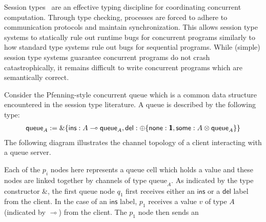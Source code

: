 Session types~\cite{honda93} are an effective typing discipline for coordinating
concurrent computation. Through type checking, processes are forced to adhere to
communication protocols and maintain synchronization. This allows session type
systems to statically rule out runtime bugs for concurrent programs similarly to
how standard type systems rule out bugs for sequential programs. While (simple)
session type systems guarantee concurrent programs do not crash catastrophically,
it remains difficult to write concurrent programs which are semantically correct.

Consider the Pfenning-style concurrent queue which is a common data structure encountered
in the session type literature. A queue is described by the following type:
\begin{align*}
  \textsf{queue}_A := \&\{
  \textsf{ins}: A \multimap \textsf{queue}_A,
  \textsf{del}: \oplus\{\textsf{none}: \textbf{\textsf{1}}, \textsf{some}: A \otimes \textsf{queue}_A\}
  \}
\end{align*}
The following diagram illustrates the channel topology of a client interacting with
a queue server.
\begin{center}
\vspace{0.4em}
\end{center}
Each of the $p_i$ nodes here represents a queue cell which holds a value and
these nodes are linked together by channels of type $\text{queue}_A$. As
indicated by the type constructor $\&$, the first queue node $q_1$ first
receives either an $\textsf{ins}$ or a $\textsf{del}$ label from the client. In
the case of an $\textsf{ins}$ label, $p_1$ receives a value $v$ of type $A$
(indicated by $\multimap$) from the client.  The $p_1$ node then sends an
